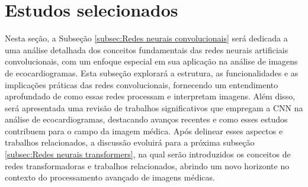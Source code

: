 \begin{table}[!ht]
\begin{center}
\caption{Tabela de artigos selecionados}
\label{tab:trabalhos}
\end{center}
\end{table}

\section{Estudos selecionados}
\label{Estudos selecionados}

Nesta seção, a Subseção \ref{subsec:Redes neurais convolucionais} será dedicada a uma análise detalhada dos conceitos fundamentais das redes neurais artificiais convolucionais, com um enfoque especial em sua aplicação na análise de imagens de ecocardiogramas. Esta subseção explorará a estrutura, as funcionalidades e as implicações práticas das redes convolucionais, fornecendo um entendimento aprofundado de como essas redes processam e interpretam imagens. Além disso, será apresentada uma revisão de trabalhos significativos que empregam a CNN na análise de ecocardiogramas, destacando avanços recentes e como esses estudos contribuem para o campo da imagem médica. Após delinear esses aspectos e trabalhos relacionados, a discussão evoluirá para a próxima subseção  \ref{subsec:Redes neurais transformers}, na qual serão introduzidos os conceitos de redes transformadoras e trabalhos relacionados, abrindo um novo horizonte no contexto do processamento avançado de imagens médicas. 

